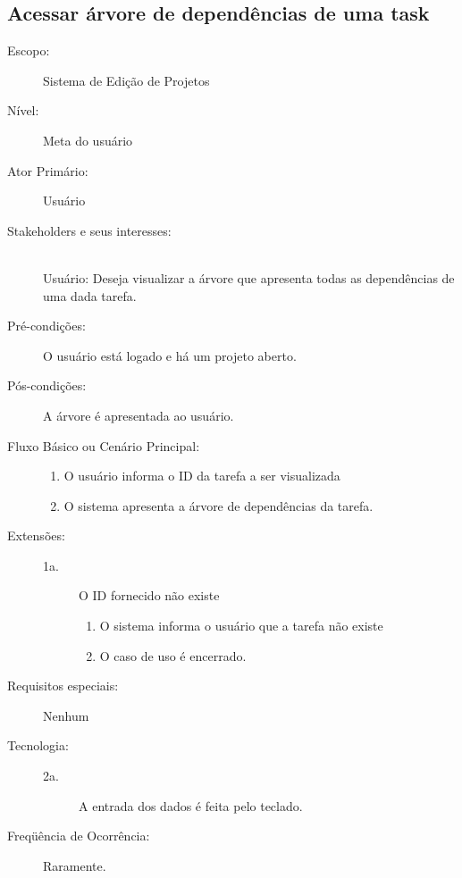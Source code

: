 \documentclass[brazil,times]{abnt}
\begin{document}
\subsection{Acessar árvore de dependências de uma task}
\begin{description}
\item[Escopo:] Sistema de Edição de Projetos
\item[Nível:] Meta do usuário
\item[Ator Primário:] Usuário

\item[Stakeholders e seus interesses:] \hfill \\ 
Usuário: Deseja visualizar a árvore que apresenta todas as dependências de uma
dada tarefa.

\item[Pré-condições:] O usuário está logado e há um projeto aberto.

\item[Pós-condições:] A árvore é apresentada ao usuário.

\item[Fluxo Básico ou Cenário Principal:] \hfill
\begin{enumerate}
  \item O usuário informa o ID da tarefa a ser visualizada
  \item O sistema apresenta a árvore de dependências da tarefa.
\end{enumerate}

\item[Extensões:] \hfill
\begin{description}
	\item[1a.] O ID fornecido não existe
		\begin{enumerate}
 			\item O sistema informa o usuário que a tarefa não existe
 			\item O caso de uso é encerrado.
		\end{enumerate}
\end{description}
\item[Requisitos especiais:] Nenhum

\item[Tecnologia:] \hfill
\begin{description} 
	\item[2a.] A entrada dos dados é feita pelo teclado.
\end{description}
\item[Freqüência de Ocorrência:] Raramente.

\end{description}
\end{document}
